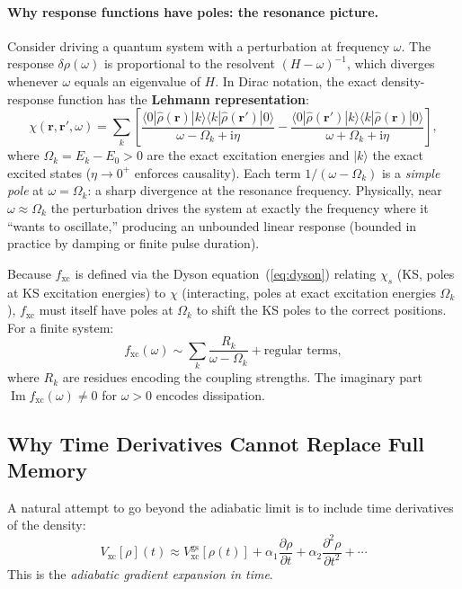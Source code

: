 \documentclass[12pt,letterpaper]{article}
\newcommand{\ii}{\mathrm{i}}
\newcommand{\Vxc}{V_{\mathrm{xc}}}
\newcommand{\fxc}{f_{\mathrm{xc}}}
\theoremstyle{definition}
\begin{document}
\paragraph{Why response functions have poles: the resonance picture.}
Consider driving a quantum system with a perturbation at frequency $\omega$.
The response $\delta\rho(\omega)$ is proportional to the resolvent
$(H - \omega)^{-1}$, which diverges whenever $\omega$ equals an eigenvalue of $H$.
In Dirac notation, the exact density-response function has the
\textbf{Lehmann representation}:
\begin{equation}
  \chi(\bm{r},\bm{r}',\omega)
  = \sum_k \left[
      \frac{\langle 0|\hat\rho(\bm{r})|k\rangle\langle k|\hat\rho(\bm{r}')|0\rangle}
           {\omega - \Omega_k + \ii\eta}
    - \frac{\langle 0|\hat\rho(\bm{r}')|k\rangle\langle k|\hat\rho(\bm{r})|0\rangle}
           {\omega + \Omega_k + \ii\eta}
    \right],
  \label{eq:lehmann}
\end{equation}
where $\Omega_k = E_k - E_0 > 0$ are the exact excitation energies and
$|k\rangle$ the exact excited states ($\eta\to 0^+$ enforces causality).
Each term $1/(\omega - \Omega_k)$ is a \emph{simple pole} at $\omega = \Omega_k$:
a sharp divergence at the resonance frequency.
Physically, near $\omega\approx\Omega_k$ the perturbation drives the system
at exactly the frequency where it ``wants to oscillate,'' producing an
unbounded linear response (bounded in practice by damping or finite pulse duration).

Because $\fxc$ is defined via the Dyson equation~(\ref{eq:dyson})
relating $\chi_s$ (KS, poles at KS excitation energies) to $\chi$
(interacting, poles at exact excitation energies $\Omega_k$), $\fxc$
must itself have poles at $\Omega_k$ to shift the KS poles to the correct
positions.  For a finite system:
\begin{equation}
  \fxc(\omega) \sim \sum_k \frac{R_k}{\omega - \Omega_k}
  + \text{regular terms},
  \label{eq:fxc_poles}
\end{equation}
where $R_k$ are residues encoding the coupling strengths.  The imaginary
part $\operatorname{Im}\fxc(\omega)\neq 0$ for $\omega>0$ encodes dissipation.

\subsection{Why Time Derivatives Cannot Replace Full Memory}
\label{sec:derivatives}

A natural attempt to go beyond the adiabatic limit is to include
time derivatives of the density:
\begin{equation}
  \Vxc[\rho](t) \approx \Vxc^{\mathrm{gs}}[\rho(t)]
  + \alpha_1\frac{\partial\rho}{\partial t}
  + \alpha_2\frac{\partial^2\rho}{\partial t^2} + \cdots
  \label{eq:gradient_expansion}
\end{equation}
This is the \emph{adiabatic gradient expansion in time}.
\end{document}
